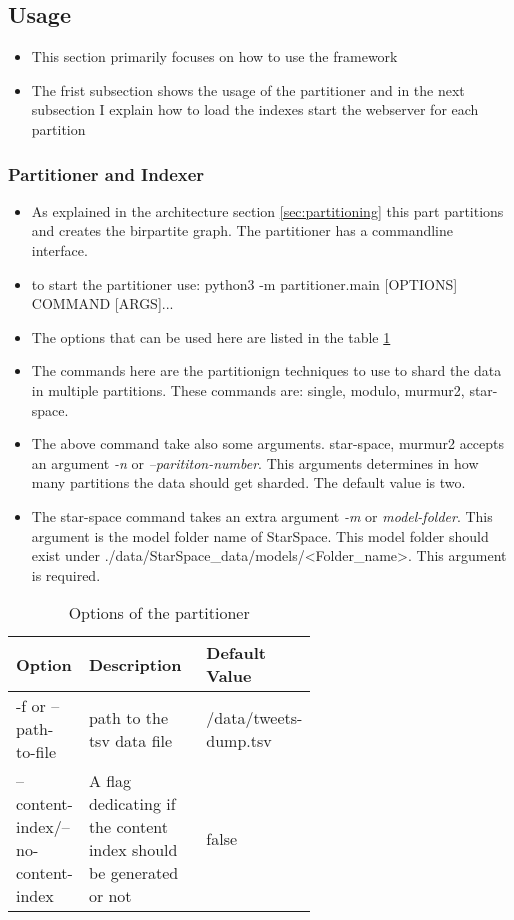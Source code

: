 \subsection{Usage}
\label{subsec:usage}
\begin{itemize}
    \item This section primarily focuses on how to use the framework
    \item The frist subsection shows the usage of the partitioner and in the next subsection I explain how to load the indexes start the webserver for each partition 
\end{itemize}

\subsubsection{Partitioner and Indexer}
\label{subsubsec:partitioner-indexer}
\begin{itemize}
    \item As explained in the architecture section \ref{sec:partitioning} this part partitions and creates the birpartite graph. The partitioner has a commandline interface.
    \item to start the partitioner use: 
    python3 -m partitioner.main [OPTIONS] COMMAND [ARGS]...
    \item The options that can be used here are listed in the table \ref{tab:options-partitioner}
    \item The commands here are the partitionign techniques to use to shard the data in multiple partitions. These commands are:
    single, modulo, murmur2, star-space.
    \item The above command take also some arguments. star-space, murmur2 accepts an argument \emph{-n} or \emph{--parititon-number}. This arguments determines in how many partitions the data should get sharded. The default value is two.
    \item The star-space command takes an extra argument \emph{-m} or \emph{model-folder}. This argument is the model folder name of StarSpace. This model folder should exist under ./data/StarSpace\_data/models/<Folder\_name>. This argument is required.
\end{itemize}

\begin{table}[!h]
	\centering
	\caption{Options of the partitioner}
	\label{tab:options-partitioner}
	\begin{tabular}{|l|m{0.4\linewidth}|m{0.2\linewidth}|}
		\hline
		\textbf{Option} & \textbf{Description} & \textbf{Default Value} \\
		\hline
		-f or --path-to-file & path to the tsv data file & /data/tweets-dump.tsv \\
		\hline
		--content-index/--no-content-index & A flag dedicating if the content index should be generated or not & false \\
		\hline
	\end{tabular}
\end{table}
